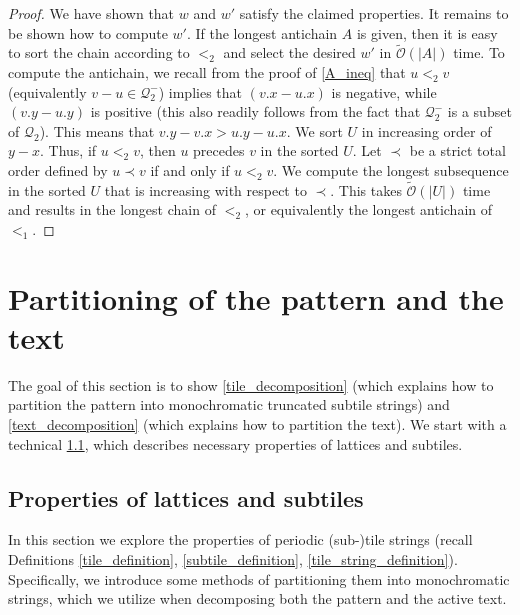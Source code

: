 \documentclass[11pt, letterpaper]{article}
\theoremstyle{plain}
\theoremstyle{definition}
\theoremstyle{remark}
\newcommand{\tO}{\tilde{\mathcal{O}}}
\newcommand{\Q}{\mathcal{Q}}
\newcommand{\absolute}[1]{\lvert#1\rvert}
\begin{document}
\begin{proof}
We have shown that $w$ and $w'$ satisfy the claimed properties. 
It remains to be shown how to compute $w'$. 
If the longest antichain $A$ is given, then it is easy to sort the chain according to $<_2$ and select the desired $w'$ in $\tO(\absolute{A})$ time. To compute the antichain, we recall from the proof of \cref{A_ineq} that $u <_2 v$ (equivalently $v - u \in \Q_2^-$) implies that $(v.x - u.x)$ is negative, while $(v.y - u.y)$ is positive (this also readily follows from the fact that $\Q_2^-$ is a subset of $\Q_2$). This means that $v.y - v.x > u.y - u.x$. We sort $U$ in increasing order of $y - x$. Thus, if $u <_2 v$, then $u$ precedes $v$ in the sorted $U$. 
Let $\prec$ be a strict total order defined by $u \prec v$ if and only if $u <_2 v$. We compute the longest subsequence in the sorted $U$ that is increasing with respect to $\prec$. This takes $\tO(\absolute{U})$ time and results in the longest chain of $<_2$, or equivalently the longest antichain of $<_1$.
\end{proof}

\section{Partitioning of the pattern and the text}
The goal of this section is to show \cref{tile_decomposition} (which explains how to partition the pattern into monochromatic truncated subtile strings) and \cref{text_decomposition} (which explains how to partition the text). We start with a technical \cref{sec:lattices_subtiles}, which describes necessary properties of lattices and subtiles. 
 
\subsection{Properties of lattices and subtiles} \label{sec:lattices_subtiles}
In this section we explore the properties of periodic (sub-)tile strings (recall Definitions \ref{tile_definition}, \ref{subtile_definition}, \ref{tile_string_definition}).
Specifically, we introduce some methods of partitioning them into monochromatic strings, which we utilize when decomposing both the pattern and the active text.
\end{document}
